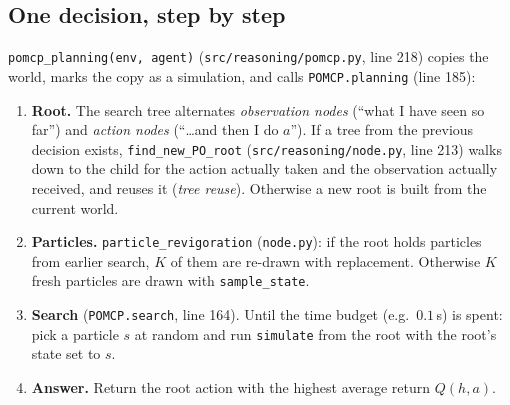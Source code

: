 \documentclass[11pt,a4paper]{article}
\newcommand{\file}{\nolinkurl}  %
\newcommand{\code}[1]{\texttt{#1}}
\theoremstyle{remark}
\begin{document}
\subsection{One decision, step by step}

\code{pomcp\_planning(env, agent)} (\file{src/reasoning/pomcp.py}, line 218) copies the world, marks the copy as a
simulation, and calls \code{POMCP.planning} (line 185):

\begin{enumerate}[leftmargin=*]
\item \textbf{Root.} The search tree alternates \emph{observation nodes} (``what I have seen so far'') and \emph{action
  nodes} (``\ldots and then I do $a$''). If a tree from the previous decision exists, \code{find\_new\_PO\_root}
  (\file{src/reasoning/node.py}, line 213) walks down to the child for the action actually taken and the observation
  actually received, and reuses it (\emph{tree reuse}). Otherwise a new root is built from the current world.
\item \textbf{Particles.} \code{particle\_revigoration} (\file{node.py}): if the root holds particles from earlier
  search, $K$ of them are re-drawn with replacement. Otherwise $K$ fresh particles are drawn with
  \code{sample\_state}.
\item \textbf{Search} (\code{POMCP.search}, line 164). Until the time budget (e.g.\ $0.1$\,s) is spent: pick a particle
  $s$ at random and run \code{simulate} from the root with the root's state set to $s$.
\item \textbf{Answer.} Return the root action with the highest average return $Q(h,a)$.
\end{enumerate}
\end{document}
